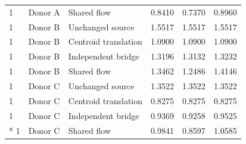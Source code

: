 \documentclass[10pt,a4paper]{article}
\begin{document}
{{\begin{longtable}{@{}p{17mm}p{24mm}p{48mm}p{24mm}p{24mm}p{24mm}@{}}
1 & Donor A & Shared flow & 0.8410 & 0.7370 & 0.8960 \\
1 & Donor B & Unchanged source & 1.5517 & 1.5517 & 1.5517 \\
1 & Donor B & Centroid translation & 1.0900 & 1.0900 & 1.0900 \\
1 & Donor B & Independent bridge & 1.3196 & 1.3132 & 1.3232 \\
1 & Donor B & Shared flow & 1.3462 & 1.2486 & 1.4146 \\
1 & Donor C & Unchanged source & 1.3522 & 1.3522 & 1.3522 \\
1 & Donor C & Centroid translation & 0.8275 & 0.8275 & 0.8275 \\
1 & Donor C & Independent bridge & 0.9369 & 0.9258 & 0.9525 \\*
1 & Donor C & Shared flow & 0.9841 & 0.8597 & 1.0585 \\
\end{longtable}
}

}
\end{document}
